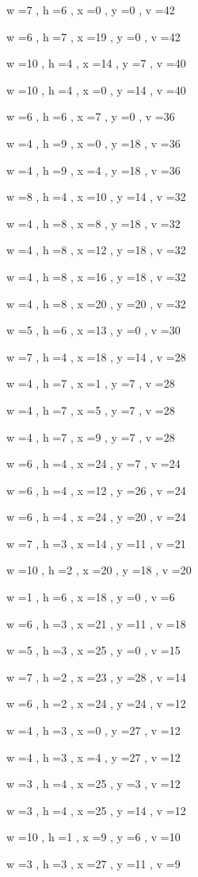 \documentclass[11pt]{article}
\begin{document}
w =7 , h =6 , x =0 , y =0 , v =42
\par
w =6 , h =7 , x =19 , y =0 , v =42
\par
w =10 , h =4 , x =14 , y =7 , v =40
\par
w =10 , h =4 , x =0 , y =14 , v =40
\par
w =6 , h =6 , x =7 , y =0 , v =36
\par
w =4 , h =9 , x =0 , y =18 , v =36
\par
w =4 , h =9 , x =4 , y =18 , v =36
\par
w =8 , h =4 , x =10 , y =14 , v =32
\par
w =4 , h =8 , x =8 , y =18 , v =32
\par
w =4 , h =8 , x =12 , y =18 , v =32
\par
w =4 , h =8 , x =16 , y =18 , v =32
\par
w =4 , h =8 , x =20 , y =20 , v =32
\par
w =5 , h =6 , x =13 , y =0 , v =30
\par
w =7 , h =4 , x =18 , y =14 , v =28
\par
w =4 , h =7 , x =1 , y =7 , v =28
\par
w =4 , h =7 , x =5 , y =7 , v =28
\par
w =4 , h =7 , x =9 , y =7 , v =28
\par
w =6 , h =4 , x =24 , y =7 , v =24
\par
w =6 , h =4 , x =12 , y =26 , v =24
\par
w =6 , h =4 , x =24 , y =20 , v =24
\par
w =7 , h =3 , x =14 , y =11 , v =21
\par
w =10 , h =2 , x =20 , y =18 , v =20
\par
w =1 , h =6 , x =18 , y =0 , v =6
\par
w =6 , h =3 , x =21 , y =11 , v =18
\par
w =5 , h =3 , x =25 , y =0 , v =15
\par
w =7 , h =2 , x =23 , y =28 , v =14
\par
w =6 , h =2 , x =24 , y =24 , v =12
\par
w =4 , h =3 , x =0 , y =27 , v =12
\par
w =4 , h =3 , x =4 , y =27 , v =12
\par
w =3 , h =4 , x =25 , y =3 , v =12
\par
w =3 , h =4 , x =25 , y =14 , v =12
\par
w =10 , h =1 , x =9 , y =6 , v =10
\par
w =3 , h =3 , x =27 , y =11 , v =9
\end{document}

